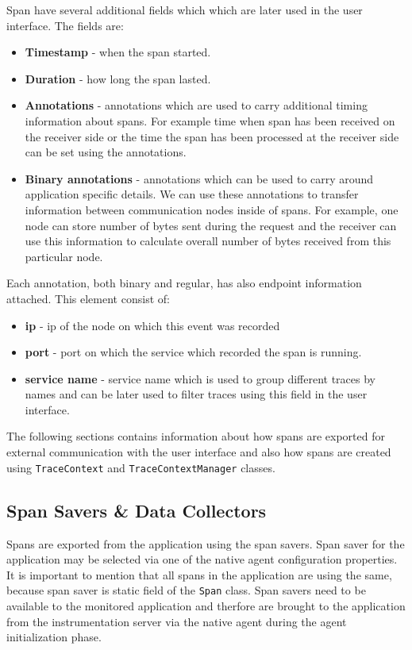 Span have several additional fields which which are later used in the user interface. The fields are:
\begin{itemize}
	\item \textbf{Timestamp} - when the span started.
	\item \textbf{Duration} - how long the span lasted.
	\item \textbf{Annotations} - annotations which are used to carry additional timing information about spans. For example time when span has been received on the receiver side or the time the span has been processed at the receiver side can be set using the annotations.
	\item \textbf{Binary annotations} - annotations which can be used to carry around application specific details. We can use these annotations to transfer information between communication nodes inside of spans. For example, one node can store number of bytes sent during the request and the receiver can use this information to calculate overall number of bytes received from this particular node.
\end{itemize}

Each annotation, both binary and regular, has also endpoint information attached. This element consist of:
\begin{itemize}
	\item \textbf{ip} - ip of the node on which this event was recorded
	\item \textbf{port} - port on which the service which recorded the span is running.
	\item \textbf{service name} - service name which is used to group different traces by names and can be later used to filter traces using this field in the user interface.
\end{itemize}

The following sections contains information about how spans are exported for external communication with the user interface and also how spans are created using \texttt{TraceContext} and \texttt{TraceContextManager} classes.
\subsection{Span Savers \& Data Collectors}
Spans are exported from the application using the span savers. Span saver for the application may be selected via one of the native agent configuration properties. It is important to mention that all spans in the application are using the same, because span saver is static field of the \texttt{Span} class. Span savers need to be available to the monitored application and therfore are brought to the application from the instrumentation server via the native agent during the agent initialization phase.

